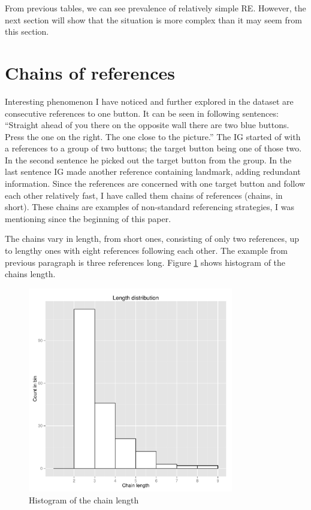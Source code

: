 From previous tables, we can see prevalence of relatively simple RE. However, the next section will show that the situation is more complex than it may seem from this section.

\section{Chains of references}
\label{sec:dataset-chains}
Interesting phenomenon I have noticed and further explored in the dataset are consecutive references to one button. It can be seen in following sentences: ``Straight ahead of you there on the opposite wall there are two blue buttons. Press the one on the right. The one close to the picture.'' The IG started of with a references to a group of two buttons; the target button being one of those two. In the second sentence he picked out the target button from the group. In the last sentence IG made another reference containing landmark, adding redundant information. Since the references are concerned with one target button and follow each other relatively fast, I have called them chains of references (chains, in short). These chains are examples of non-standard referencing strategies, I was mentioning since the beginning of this paper.

The chains vary in length, from short ones, consisting of only two references, up to lengthy ones with eight references following each other. The example from previous paragraph is three references long. Figure \ref{fig:chains_len_histo} shows histogram of the chains length.

\begin{figure}[!htbp]
  \centering
	\includegraphics[width=0.8\textwidth]{Images/chains_len_histo}
	\caption{Histogram of the chain length}
	\label{fig:chains_len_histo}
\end{figure}

